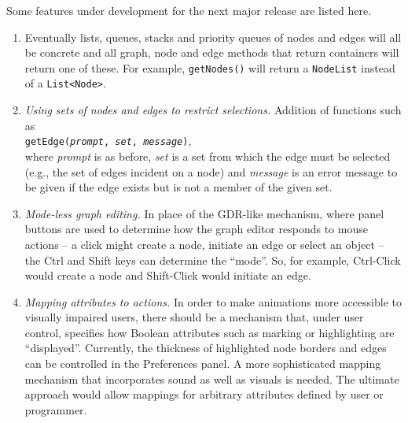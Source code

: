 Some features under development for the next major release are listed here.

\begin{enumerate}
\item \label{item:data_structures}
  Eventually
  lists, queues, stacks and priority queues of nodes and edges will all be
  concrete and all graph, node and edge methods that return containers will
  return one of these. For example, \texttt{getNodes()} will return a
  \texttt{NodeList} instead of a \texttt{List<Node>}.


\item \label{item:sets}
  \emph{Using sets of nodes and edges to restrict selections.}
  Addition of functions such as\\
  \hspace*{2em}\mbox{\texttt{getEdge(\emph{prompt}, \emph{set}, \emph{message})}},\\
  where \emph{prompt} is as before, \emph{set} is
  a set from which the edge must be selected (e.g., the set of edges incident
  on a node) and \emph{message} is an error message to be given if the
  edge exists but is not a member of the given set.

\item
  \emph{Mode-less graph editing.}
  In place of the GDR-like mechanism, where panel buttons are used to determine
  how the graph editor responds to mouse actions -- a click might create a node,
  initiate an edge or select an object --
  the \textsf{Ctrl} and \textsf{Shift} keys can determine the ``mode''.
  So, for example, \textsf{Ctrl-Click} would create a node and
  \textsf{Shift-Click} would initiate an edge.

\item
  \emph{Mapping attributes to actions.}
  In order to make animations more accessible to visually impaired users,
  there should be a mechanism that, under user control, specifies how Boolean
  attributes such as marking or highlighting are ``displayed''.
  Currently, the thickness of highlighted node borders and edges can be
  controlled in the \textsf{Preferences} panel.
  A more sophisticated mapping mechanism that incorporates sound as well as visuals is needed.
  The ultimate approach would allow mappings for arbitrary attributes
  defined by user or programmer.
  
\end{enumerate}
